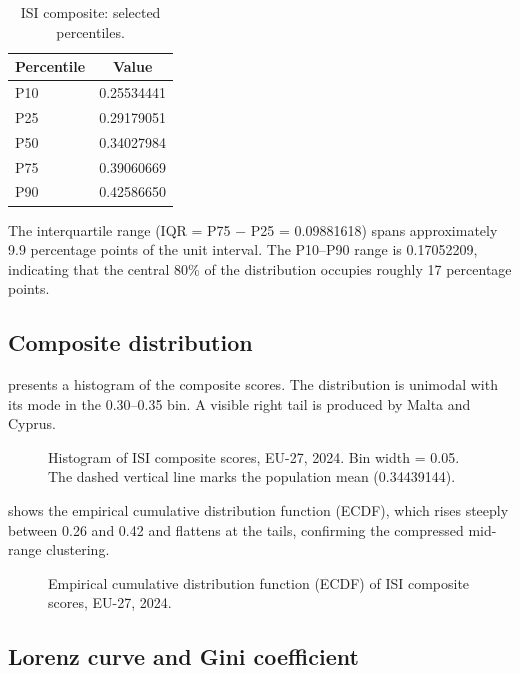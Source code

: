 \begin{table}[htbp]
\centering
\caption{ISI composite: selected percentiles.}
\label{tab:percentiles}
\begin{tabular}{@{}lS[table-format=1.8]@{}}
\toprule
\textbf{Percentile} & {\textbf{Value}} \\
\midrule
P10  & 0.25534441 \\
P25  & 0.29179051 \\
P50  & 0.34027984 \\
P75  & 0.39060669 \\
P90  & 0.42586650 \\
\bottomrule
\end{tabular}
\end{table}

The interquartile range (IQR = P75 $-$ P25 = \num{0.09881618})
spans approximately 9.9 percentage points of the unit interval.
The P10--P90 range is \num{0.17052209}, indicating that the central
80\% of the distribution occupies roughly 17 percentage points.

\subsection{Composite distribution}\label{sec:composite-distribution}

 presents a histogram of the composite scores.
The distribution is unimodal with its mode in the 0.30--0.35 bin.
A visible right tail is produced by Malta and Cyprus.

\begin{figure}[htbp]
\centering

\caption{Histogram of ISI composite scores, EU-27, 2024.  Bin width
  = 0.05.  The dashed vertical line marks the population mean
  (\num{0.34439144}).}
\label{fig:histogram}
\end{figure}

 shows the empirical cumulative distribution function
(ECDF), which rises steeply between 0.26 and 0.42 and flattens at
the tails, confirming the compressed mid-range clustering.

\begin{figure}[htbp]
\centering

\caption{Empirical cumulative distribution function (ECDF) of ISI
  composite scores, EU-27, 2024.}
\label{fig:ecdf}
\end{figure}

\subsection{Lorenz curve and Gini coefficient}

